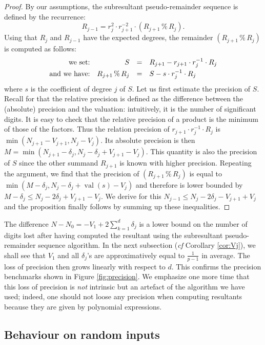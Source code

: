 \documentclass{sig-alternate}
\DeclareMathOperator{\val}{val}
\begin{document}
\begin{proof}
By our assumptions, the subresultant pseudo-remainder sequence 
is defined by the recurrence:
$$R_{j-1} = r_j^2 \cdot r_{j+1}^{-2} \cdot 
(R_{j+1} \,\%\, R_j).$$
Using that $R_j$ and $R_{j-1}$ have the expected degrees, the
remainder $(R_{j+1} \,\%\, R_j)$ is computed as follows:
$$\begin{array}{rrcl}
\text{we set:} & S & = & R_{j+1} - r_{j+1} \cdot r_j^{-1} \cdot R_j \smallskip \\
\text{and we have:} & R_{j+1} \,\%\, R_j & = & S - s \cdot r_j^{-1} \cdot R_j
\end{array}$$
where $s$ is the coefficient of degree $j$ of $S$. Let us first estimate 
the precision of $S$. Recall for that the relative precision is defined 
as the difference between the (absolute) precision and the valuation: 
intuitively, it is the number of significant digits. It is easy to check 
that the relative precision of a product is the minimum of those of the 
factors. 
Thus the relation precision of $r_{j+1} \cdot r_j^{-1} \cdot R_j$ is
$\min(N_{j+1} - V_{j+1}, N_j - V_j)$. Its absolute precision is then
$M = \min(N_{j+1} - \delta_j, N_j - \delta_j + V_{j+1} - V_j)$. This
quantity is also the precision of $S$ since the other summand
$R_{j+1}$ is known with higher precision. Repeating the argument, we
find that the precision of $(R_{j+1} \,\%\, R_j)$ is equal to 
$\min(M - \delta_j, N_j - \delta_j + \val(s) - V_j)$ and therefore is 
lower bounded by $M - \delta_j \leq N_j - 2 \delta_j + V_{j+1} - V_j$.
We derive for this $N_{j-1} \leq N_j - 2 \delta_j - V_{j+1} + V_j$ and
the proposition finally follows by summing up these inequalities.
\end{proof}

The difference 
$N - N_0 = - V_1 + 2 \sum_{k=1}^d \delta_j$
is a lower bound on the number of digits lost after having computed the 
resultant using the subresultant pseudo-remainder sequence algorithm. In 
the next subsection (\emph{cf} Corollary \ref{cor:Vj}), we shall see that 
$V_1$ and all $\delta_j$'s are 
approximatively equal to $\frac 1 {p-1}$ in average. The loss of 
precision then grows linearly with respect to $d$. This confirms the 
precision benchmarks shown in Figure \ref{fig:precision}.
We emphasize one more time that this loss of precision is \emph{not}
intrinsic but an artefact of the algorithm we have used; indeed, one
should not loose any precision when computing resultants because they
are given by polynomial expressions.

\subsection{Behaviour on random inputs}
\end{document}
